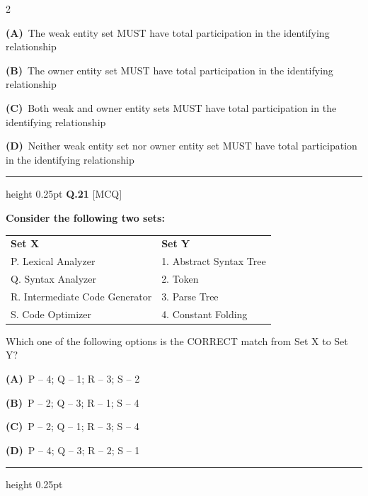 \documentclass[a4paper,10pt,twoside]{article}
\begin{document}
\begin{multicols}{2}
\par\vspace{2pt}\noindent
\textbf{(A)}~The weak entity set MUST have total participation in the identifying relationship\par\vspace{2pt}\noindent
\textbf{(B)}~The owner entity set MUST have total participation in the identifying relationship\par\vspace{2pt}\noindent
\textbf{(C)}~Both weak and owner entity sets MUST have total participation in the identifying relationship\par\vspace{2pt}\noindent
\textbf{(D)}~Neither weak entity set nor owner entity set MUST have total participation in the identifying relationship
\par\vspace{6pt}\hrule height 0.25pt\vspace{6pt}
\noindent\textbf{Q.21} \hfill {\footnotesize\textsf{[MCQ]}}
\par\vspace{2pt}
{\bfseries Consider the following two sets:
\par\smallskip
\begin{tabular}{ll}
\textbf{Set X} & \textbf{Set Y} \\
P. Lexical Analyzer & 1. Abstract Syntax Tree \\
Q. Syntax Analyzer & 2. Token \\
R. Intermediate Code Generator & 3. Parse Tree \\
S. Code Optimizer & 4. Constant Folding
\end{tabular}
\par\smallskip
Which one of the following options is the CORRECT match from Set X to Set Y? \par}
\par\vspace{2pt}\noindent
\textbf{(A)}~P -- 4; Q -- 1; R -- 3; S -- 2\par\vspace{2pt}\noindent
\textbf{(B)}~P -- 2; Q -- 3; R -- 1; S -- 4\par\vspace{2pt}\noindent
\textbf{(C)}~P -- 2; Q -- 1; R -- 3; S -- 4\par\vspace{2pt}\noindent
\textbf{(D)}~P -- 4; Q -- 3; R -- 2; S -- 1
\par\vspace{6pt}\hrule height 0.25pt\vspace{6pt}

\end{multicols}
\end{document}
